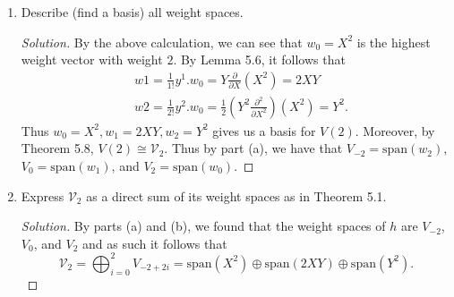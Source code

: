\documentclass[12pt]{article}
\theoremstyle{definition}
\newenvironment{solution}
{\renewcommand\qedsymbol{$\blacksquare$}\begin{proof}[Solution]}
{\end{proof}}
\begin{document}
\begin{enumerate}
\begin{enumerate}
\begin{solution}
\begin{align*}
                                &h.XY = (X\frac{\partial}{\partial
                                X}-Y\frac{\partial}{\partial Y})XY =XY-XY=0& \\
                                &h.Y^2 = (X\frac{\partial}{\partial
                                X}-Y\frac{\partial}{\partial Y})Y^2=-2Y^2.
                            \end{align*}
                        This suffices to show that the only weights of $h$ for
                        $\mathcal{V}_2$ are 2, 0, and -2.
                    \end{solution}
                \item Describe (find a basis) all weight spaces. 
                    \begin{solution}
                        By the above calculation, we can see that $w_0=X^2$ is the
                        highest weight vector with weight $2$. By Lemma 5.6, it
                        follows that 
                        \begin{equation*}
                            \begin{split}
                                &w1 = \frac{1}{1!}y^1.w_0=Y\frac{\partial}{\partial
                                X}(X^2)=2XY \\
                                &w2
                                = \frac{1}{2!}y^2.w_0=\frac{1}{2}(Y^2\frac{\partial^2}{\partial
                                X^2})(X^2)=Y^2.
                            \end{split}
                        \end{equation*}
                        Thus $w_0=X^2, w_1=2XY, w_2=Y^2$ gives us a basis for
                        $V(2)$. Moreover, by Theorem 5.8, $V(2)\cong\mathcal{V}_2$.
                        Thus by part (a), we have that $V_{-2}=\text{span}(w_2)$,
                        $V_0=\text{span}(w_1)$, and $V_2=\text{span}(w_0)$.
                    \end{solution}
                \item Express $\mathcal{V}_2$ as a direct sum of its weight
                    spaces as in Theorem 5.1.
                    \begin{solution}
                        By parts (a) and (b), we found that the weight spaces
                        of $h$ are $V_{-2}$, $V_0$, and $V_2$ and as such it
                        follows that 
                        \begin{equation*}
                            \mathcal{V}_2=\bigoplus_{i=0}^2V_{-2+2i}=\text{span}(X^2)\oplus\text{span}(2XY)\oplus\text{span}(Y^2).

\end{equation*}
\end{solution}
\end{enumerate}
\end{enumerate}
\end{document}
